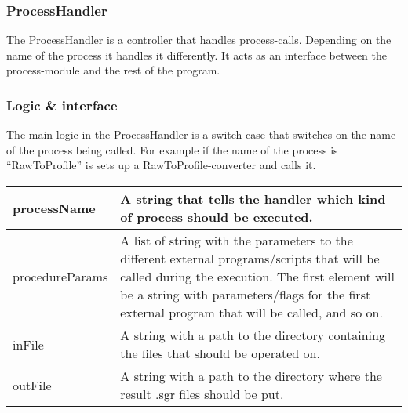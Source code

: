 \subsubsection{ProcessHandler}
The ProcessHandler is a controller that handles process-calls. Depending on the name of the process it handles it differently. It acts as an interface between the process-module and the rest of the program. 


\subsubsection{Logic \& interface}
The main logic in the ProcessHandler is a switch-case that switches on the name of the process being called. For example if the name of the process is “RawToProfile” is sets up a RawToProfile-converter and calls it. 

\begin{tabular}{|l| p{7cm}|}
\hline
processName & A string that tells the handler which kind of process should be
executed. \\ \hline
procedureParams & A list of string with the parameters to the different external
programs/scripts that will be called during the execution. The first element
will be a string with parameters/flags for the first external program that will
be called, and so on. \\ \hline
inFile & A string with a path to the directory containing the files that should
be operated on. \\ \hline
outFile & A string with a path to the directory where the result .sgr files
should be put. \\ \hline
\end{tabular}




